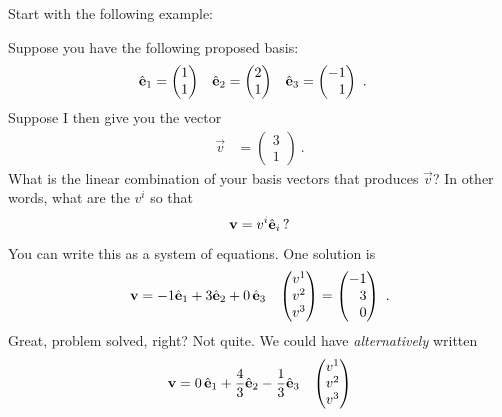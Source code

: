 Start with the following example:
\begin{example}
Suppose you have the following proposed basis:
\begin{align}
    \bas{e}_1 &=
    \begin{pmatrix}
        1\\
        1
    \end{pmatrix}
    &
    \bas{e}_2 &=
    \begin{pmatrix}
        2\\
        1
    \end{pmatrix}
    &
    \bas{e}_3 &=
    \begin{pmatrix}
        -1\\
        \pp 1
    \end{pmatrix} \ .
    \label{eq:eg:too:many:basis:vectors:basis}
\end{align}
Suppose I then give you the vector
\begin{align}
    \vec{v} &=
    \begin{pmatrix}
        3 \\ 1
    \end{pmatrix} \ .
\end{align}
What is the linear combination of your basis vectors that produces $\vec{v}$? In other words, what are the $v^i$ so that
\begin{align}
    \mathbf{v}= v^i \hat{\mathbf{e}}_i \, ?
\end{align}
You can write this as a system of equations. One solution is
\begin{align}
    \vec{v} &= -1\bas{e}_1 + 3\bas{e}_2 + 0\,\bas{e}_3 
    &
    \begin{pmatrix}
        v^1 \\ v^2 \\ v^3
    \end{pmatrix}
    =
    \begin{pmatrix}
        -1 \\ \pp 3 \\ \pp 0
    \end{pmatrix} \ .
\end{align}
Great, problem solved, right? Not quite. We could have \emph{alternatively} written
\begin{align}
    \vec{v} &= 0\,\bas{e}_1 + \frac{4}{3}\bas{e}_2 - \frac{1}{3}\bas{e}_3 
    &
    \begin{pmatrix}
        v^1 \\ v^2 \\ v^3
    \end{pmatrix}

\end{align}
\end{example}
